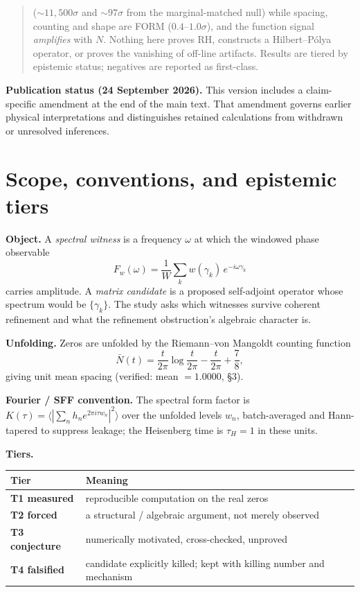 \documentclass[11pt]{article}
\begin{document}
\begin{abstract}
($\sim\!11{,}500\sigma$ and $\sim\!97\sigma$ from the marginal-matched null) while spacing, counting and shape are FORM ($0.4$--$1.0\sigma$), and the function signal \emph{amplifies} with $N$. Nothing here proves RH, constructs a Hilbert--P\'olya operator, or proves the vanishing of off-line artifacts. Results are tiered by epistemic status; negatives are reported as first-class.
\end{abstract}
\par\smallskip\noindent\textbf{Publication status (24 September 2026).}
This version includes a claim-specific amendment at the end of the main text.
That amendment governs earlier physical interpretations and distinguishes
retained calculations from withdrawn or unresolved inferences.\par\smallskip


\section{Scope, conventions, and epistemic tiers}

\textbf{Object.} A \emph{spectral witness} is a frequency $\omega$ at which the windowed phase observable
\[
F_w(\omega)=\frac{1}{W}\sum_k w(\gamma_k)\,e^{-i\omega\gamma_k}
\]
carries amplitude. A \emph{matrix candidate} is a proposed self-adjoint operator whose spectrum would be $\{\gamma_k\}$. The study asks which witnesses survive coherent refinement and what the refinement obstruction's algebraic character is.

\textbf{Unfolding.} Zeros are unfolded by the Riemann--von Mangoldt counting function
\[
\bar N(t)=\frac{t}{2\pi}\log\frac{t}{2\pi}-\frac{t}{2\pi}+\frac{7}{8},
\]
giving unit mean spacing (verified: mean $=1.0000$, \S3).

\textbf{Fourier / SFF convention.} The spectral form factor is $K(\tau)=\big\langle|\sum_n h_n e^{2\pi i\tau w_n}|^2\big\rangle$ over the unfolded levels $w_n$, batch-averaged and Hann-tapered to suppress leakage; the Heisenberg time is $\tau_H=1$ in these units.

\textbf{Tiers.}
\begin{center}
\begin{adjustbox}{max width=\linewidth}\begin{tabular}{ll}
\toprule
Tier & Meaning \\
\midrule
\textbf{T1 measured} & reproducible computation on the real zeros \\
\textbf{T2 forced} & a structural / algebraic argument, not merely observed \\
\textbf{T3 conjecture} & numerically motivated, cross-checked, unproved \\
\textbf{T4 falsified} & candidate explicitly killed; kept with killing number and mechanism \\
\bottomrule
\end{tabular}\end{adjustbox}
\end{center}
\end{document}
